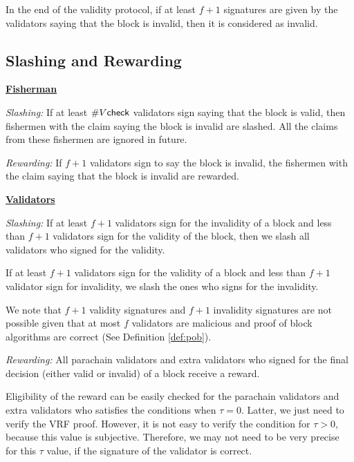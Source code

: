 In the end of the validity protocol, if at least $f+1$ signatures are given by the validators saying that the block is invalid, then it is considered as invalid.
\subsection{Slashing and Rewarding}

\underline{\textbf{Fisherman}} 

\emph{Slashing:} If at least $\#V\mathsf{check}$ validators sign saying that the block is valid, then fishermen with the claim saying the block is invalid are slashed. All the claims from these fishermen are ignored in future.

\emph{Rewarding:} If $f+1$ validators sign to say the block is invalid, the  fishermen with the claim saying that the block is invalid are rewarded.


\noindent\underline{\textbf{Validators}}

\emph{Slashing:} If at least $f+1$ validators sign for the invalidity of a block and less than $f+1$ validators sign for the validity of the block, then we slash all validators who signed for the validity.

If at least $f+1$ validators sign for the validity of a block and less than $f+1$ validator sign for invalidity, we slash the ones who signs for the invalidity.

We note that $f+1$ validity signatures and $f+1$ invalidity signatures are not possible given that at most $f$ validators are malicious and proof of block algorithms  are correct (See Definition \ref{def:pob}).

\emph{Rewarding:} All parachain validators and extra validators who signed for the final decision (either valid or invalid) of a block receive a reward. 

Eligibility of the reward can be easily checked for the parachain validators and extra validators who satisfies the conditions when $\tau = 0$. Latter, we just need to verify the VRF proof.
However, it is not easy to verify the condition for $\tau > 0$, because this value is subjective. Therefore, we may not need to be very precise for this $\tau$ value, if the signature of the validator is correct.
